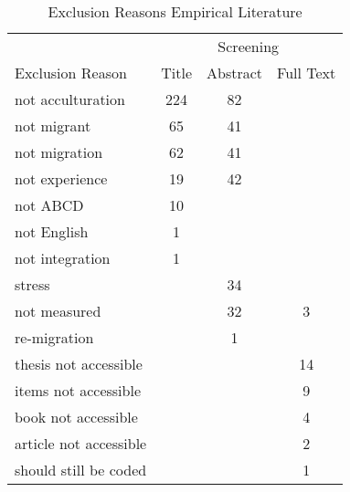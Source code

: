 \begin{table}
\begin{minipage}[t][\textheight][t]{\textwidth}

\caption{\label{tab:EmpiricalExclusion}Exclusion Reasons Empirical Literature}
\begin{tabular}[t]{lccc}
\toprule
\multicolumn{1}{c}{ } & \multicolumn{3}{c}{Screening} \\
\cmidrule(l{3pt}r{3pt}){2-4}
Exclusion Reason & Title & Abstract & Full Text\\
\midrule
not acculturation & 224 & 82 & \\
not migrant & 65 & 41 & \\
not migration & 62 & 41 & \\
not experience & 19 & 42 & \\
not ABCD & 10 &  & \\
not English & 1 &  & \\
not integration & 1 &  & \\
stress &  & 34 & \\
not measured &  & 32 & 3\\
re-migration &  & 1 & \\
thesis not accessible &  &  & 14\\
items not accessible &  &  & 9\\
book not accessible &  &  & 4\\
article not accessible &  &  & 2\\
should still be coded &  &  & 1\\
\bottomrule
\end{tabular}
\end{minipage}
\end{table}
